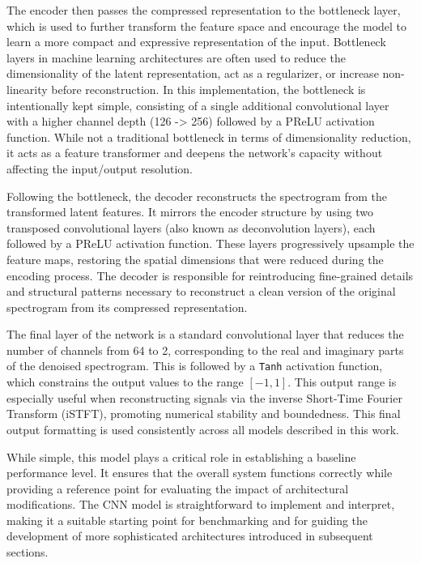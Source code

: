The encoder then passes the compressed representation to the bottleneck layer, which is used to further transform the feature space and encourage the model to learn a more compact and expressive representation of the input. Bottleneck layers in machine learning architectures are often used to reduce the dimensionality of the latent representation, act as a regularizer, or increase non-linearity before reconstruction. In this implementation, the bottleneck is intentionally kept simple, consisting of a single additional convolutional layer with a higher channel depth (126 -> 256) followed by a PReLU activation function. While not a traditional bottleneck in terms of dimensionality reduction, it acts as a feature transformer and deepens the network's capacity without affecting the input/output resolution.

Following the bottleneck, the decoder reconstructs the spectrogram from the transformed latent features. It mirrors the encoder structure by using two transposed convolutional layers (also known as deconvolution layers), each followed by a PReLU activation function. These layers progressively upsample the feature maps, restoring the spatial dimensions that were reduced during the encoding process. The decoder is responsible for reintroducing fine-grained details and structural patterns necessary to reconstruct a clean version of the original spectrogram from its compressed representation.

The final layer of the network is a standard convolutional layer that reduces the number of channels from 64 to 2, corresponding to the real and imaginary parts of the denoised spectrogram. This is followed by a \texttt{Tanh} activation function, which constrains the output values to the range \([-1, 1]\). This output range is especially useful when reconstructing signals via the inverse Short-Time Fourier Transform (iSTFT), promoting numerical stability and boundedness. This final output formatting is used consistently across all models described in this work.


While simple, this model plays a critical role in establishing a baseline performance level. It ensures that the overall system functions correctly while providing a reference point for evaluating the impact of architectural modifications. The CNN model is straightforward to implement and interpret, making it a suitable starting point for benchmarking and for guiding the development of more sophisticated architectures introduced in subsequent sections.

